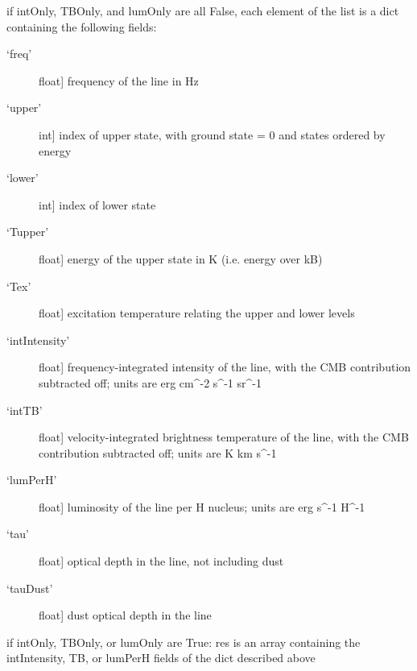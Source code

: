 \documentclass[letterpaper,10pt,english]{sphinxmanual}
\begin{document}
\begin{fulllineitems}
\begin{fulllineitems}
\begin{description}
if intOnly, TBOnly, and lumOnly are all False, each element
of the list is a dict containing the following fields:
\begin{description}
\item[{`freq'}] \leavevmode{[}float{]}
frequency of the line in Hz

\item[{`upper'}] \leavevmode{[}int{]}
index of upper state, with ground state = 0 and states
ordered by energy

\item[{`lower'}] \leavevmode{[}int{]}
index of lower state

\item[{`Tupper'}] \leavevmode{[}float{]}
energy of the upper state in K (i.e. energy over kB)

\item[{`Tex'}] \leavevmode{[}float{]}
excitation temperature relating the upper and lower levels

\item[{`intIntensity'}] \leavevmode{[}float{]}
frequency-integrated intensity of the line, with the CMB
contribution subtracted off; units are erg cm\textasciicircum{}-2 s\textasciicircum{}-1 sr\textasciicircum{}-1

\item[{`intTB'}] \leavevmode{[}float{]}
velocity-integrated brightness temperature of the line,
with the CMB contribution subtracted off; units are K km
s\textasciicircum{}-1

\item[{`lumPerH'}] \leavevmode{[}float{]}
luminosity of the line per H nucleus; units are erg s\textasciicircum{}-1
H\textasciicircum{}-1

\item[{`tau'}] \leavevmode{[}float{]}
optical depth in the line, not including dust

\item[{`tauDust'}] \leavevmode{[}float{]}
dust optical depth in the line

\end{description}

\end{description}

if intOnly, TBOnly, or lumOnly are True: res is an array
containing the intIntensity, TB, or lumPerH fields of the dict
described above

\end{fulllineitems}



\end{fulllineitems}
\end{document}
